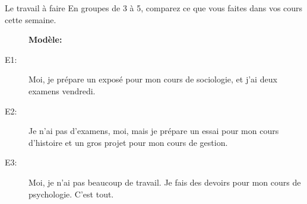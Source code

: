 \begin{frame}{Le travail à faire}
  En groupes de 3 à 5, comparez ce que vous faites dans vos cours cette semaine. \\
  \begin{description}
    \item[] \textbf{Modèle:}
    \item[E1:] Moi, je prépare un exposé pour mon cours de sociologie, et j'ai deux examens vendredi.
    \item[E2:] Je n'ai pas d'examens, moi, mais je prépare un essai pour mon cours d'histoire et un gros projet pour mon cours de gestion.
    \item[E3:] Moi, je n'ai pas beaucoup de travail. Je fais des devoirs pour mon cours de psychologie. C'est tout.
  \end{description}
\end{frame}